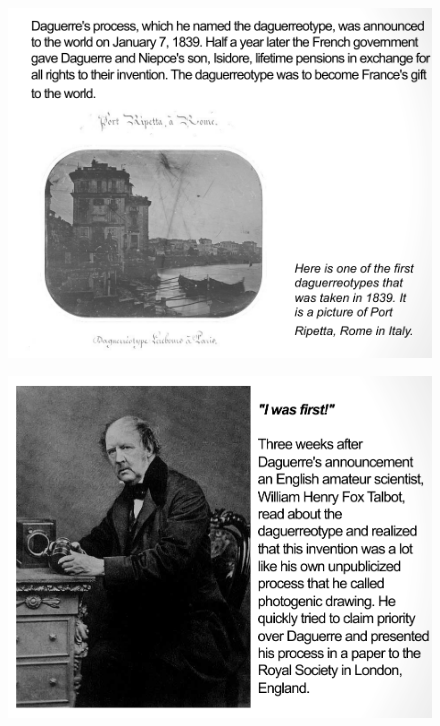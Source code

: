 \documentclass{beamer}
\begin{document}
\begin{frame}
	\begin{figure}
		\centering
		\includegraphics[scale=0.4]{79.jpg}
	\end{figure}
\end{frame}

\begin{frame}
	\begin{figure}
		\centering
		\includegraphics[scale=0.4]{80.jpg}
	\end{figure}
\end{frame}
\end{document}

